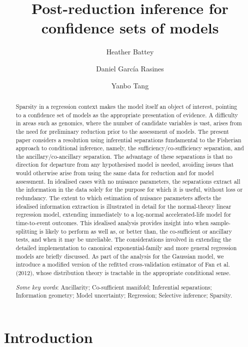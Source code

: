\documentclass[10pt, reqno]{amsart}
\author{Heather Battey}
\author{Daniel Garc{\'i}a Rasines}
\author{Yanbo Tang}
\numberwithin{equation}{section}
\begin{document}
	
	
	\title[]{Post-reduction inference for confidence sets of models}
	
\begin{abstract}
	Sparsity in a regression context makes the model itself an object of interest, pointing to a confidence set of models as the appropriate presentation of evidence. A difficulty in areas such as genomics, where the number of candidate variables is vast, arises from the need for preliminary reduction prior to the assessment of models. The present paper considers a resolution using inferential separations fundamental to the Fisherian approach to conditional inference, namely, the sufficiency/co-sufficiency separation, and the ancillary/co-ancillary separation. The advantage of these separations is that no direction for departure from any hypothesised model is needed, avoiding issues that would otherwise arise from using the same data for reduction and for model assessment. In idealised cases with no nuisance parameters, the separations extract all the information in the data solely for the purpose for which it is useful, without loss or redundancy. The extent to which estimation of nuisance parameters affects the idealised information extraction is illustrated in detail for the normal-theory linear regression model, extending immediately to a log-normal accelerated-life model for time-to-event outcomes. This idealised analysis provides insight into when sample-splitting is likely to perform as well as, or better than, the co-sufficient or ancillary tests, and when it may be unreliable. The considerations involved in extending the detailed implementation to canonical exponential-family and more general regression models are briefly discussed. As part of the analysis for the Gaussian model, we introduce a modified version of the refitted cross-validation estimator of Fan et al. (2012), whose distribution theory is tractable in the appropriate conditional sense.

		\medskip
		
		\emph{Some key words}: Ancillarity; Co-sufficient manifold; Inferential separations; Information geometry; Model uncertainty; Regression; Selective inference; Sparsity.
	\end{abstract}		
	
	\maketitle

	
	\section{Introduction}\label{secIntro}
\end{document}
